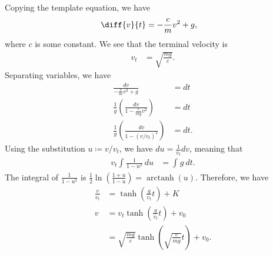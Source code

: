 \documentclass[10pt]{mypackage}
\begin{document}
\RaggedRight
\begin{solution}[38.5]
  Copying the template equation, we have
  \begin{align*}
    \diff{v}{t} &= -\frac{c}{m}v^2 + g,
  \end{align*}
  where $c$ is some constant. We see that the terminal velocity is
  \begin{align*}
    v_t &= \sqrt{\frac{mg}{c}}.
  \end{align*}
  Separating variables, we have
  \begin{align*}
    \frac{dv}{-\frac{c}{m}v^2 + g} &= dt\\
    \frac{1}{g}\left( \frac{dv}{1 - \frac{c}{mg}v^2} \right) &= dt\\
    \frac{1}{g}\left( \frac{dv}{1 - \left(v/v_t\right)^2} \right) &= dt.
  \end{align*}
  Using the substitution $u \coloneq v/v_t$, we have $du = \frac{1}{v_t} dv$, meaning that
  \begin{align*}
    v_t \int_{}^{} \frac{1}{1-u^2}\:du &= \int_{}^{} g\:dt.
  \end{align*}
  The integral of $\frac{1}{1-u^2}$ is $\frac{1}{2}\ln\left( \frac{1+u}{1-u} \right) = \operatorname{arctanh}\left( u \right)$. Therefore, we have
  \begin{align*}
    \frac{v}{v_t} &= \tanh\left( \frac{g}{v_t}t \right) + K\\
    v &= v_t \tanh\left( \frac{g}{v_t}t \right) + v_0\\
      &= \sqrt{\frac{mg}{c}}\tanh\left( \sqrt{\frac{c}{mg}}t \right) + v_0.
  \end{align*}
\end{solution}
\end{document}
